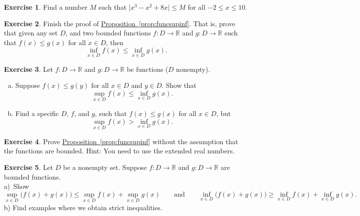 \documentclass[12pt]{book}
\newcommand{\sabs}[1]{\lvert {#1} \rvert}
\newcommand{\R}{{\mathbb{R}}}
\theoremstyle{plain}
\theoremstyle{remark}
\theoremstyle{definition}
\theoremstyle{exercise}
\newtheorem{exercise}{Exercise}[section]
\theoremstyle{example}
\newcommand{\propref}[1]{\hyperref[#1]{Proposition~\ref*{#1}}}
\begin{document}
\begin{exercise}
Find a number $M$ such that $\sabs{x^3-x^2+8x} \leq M$ for all $-2 \leq x \leq
10$.
\end{exercise}

\begin{exercise}
Finish the proof of \propref{prop:funcsupinf}.
That is, prove that
given any set $D$,
and two bounded functions
$f \colon D \to \R$ and $g \colon D \to \R$ 
such that $f(x) \leq g(x)$ for all $x \in D$, then 
\begin{equation*}
\inf_{x\in D} f(x) \leq \inf_{x\in D} g(x) .
\end{equation*}
\end{exercise}

\begin{exercise}
Let 
$f \colon D \to \R$ and $g \colon D \to \R$ be functions ($D$ nonempty).
\begin{enumerate}[a)]
%
\item
Suppose 
$f(x) \leq g(y)$ for all $x \in D$ and $y \in D$.  Show that
\begin{equation*}
\sup_{x\in D} f(x) \leq \inf_{x\in D} g(x) .
\end{equation*}
%
\item
Find a specific $D$, $f$, and $g$, such that
$f(x) \leq g(x)$ for all $x \in D$, but
\begin{equation*}
\sup_{x\in D} f(x) > \inf_{x\in D} g(x) .
\end{equation*}
\end{enumerate}
\end{exercise}

\begin{exercise}
Prove \propref{prop:funcsupinf} without the assumption that
the functions are bounded.  Hint: You need to use the extended real
numbers.
\end{exercise}

\begin{exercise} \label{exercise:sumofsup}
Let $D$ be a nonempty set.
Suppose $f \colon D \to \R$ and $g \colon D \to \R$ are bounded functions.
\\
a)~Show 
\begin{equation*}
\sup_{x\in D} \bigl(f(x) + g(x) \bigr) \leq
\sup_{x\in D} f(x)
+
\sup_{x\in D} g(x)
\qquad \text{and} \qquad
\inf_{x\in D} \bigl(f(x) + g(x) \bigr) \geq
\inf_{x\in D} f(x)
+
\inf_{x\in D} g(x) .
\end{equation*}
b) Find examples where we obtain strict inequalities.
\end{exercise}
\end{document}
